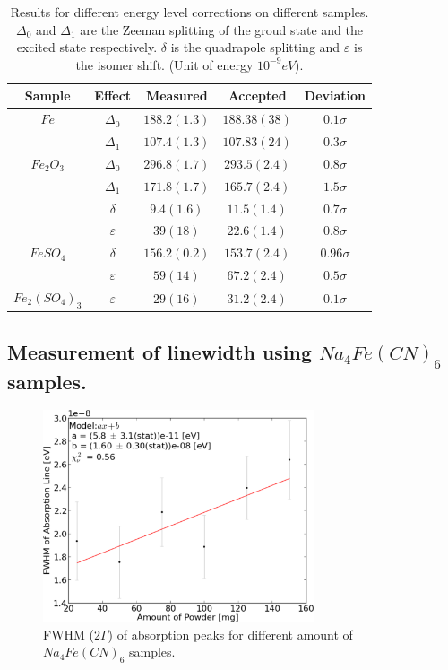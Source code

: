 \documentclass[aps,twocolumn,secnumarabic,balancelastpage,amsmath,amssymb,nofootinbib]{revtex4}
\begin{document}
\begin{table}
  \begin{tabular}{|c|c|c|c|c|}
    \hline
    Sample&Effect&Measured&Accepted&Deviation\\\hline
    $Fe$\cite{data3}&$\Delta_0$&$188.2(1.3)$&$188.38(38)$&$0.1\sigma$\\\cline{2-5}
    &$\Delta_1$&$107.4(1.3)$&$107.83(24)$&$0.3\sigma$\\\hline
    $Fe_2O_3$\cite{data1}\cite{data2}&$\Delta_0$&$296.8(1.7)$&$293.5(2.4)$&$0.8\sigma$\\\cline{2-5}
    &$\Delta_1$&$171.8(1.7)$&$165.7(2.4)$&$1.5\sigma$\\\cline{2-5}
    &$\delta$&$9.4(1.6)$&$11.5(1.4)$&$0.7\sigma$\\\cline{2-5}
    &$\varepsilon$&$39(18)$&$22.6(1.4)$&$0.8\sigma$\\\hline
    $FeSO_4$\cite{data1}&$\delta$&$156.2(0.2)$&$153.7(2.4)$&$0.96\sigma$\\\cline{2-5}
    &$\varepsilon$&$59(14)$&$67.2(2.4)$&$0.5\sigma$\\\hline
    $Fe_2(SO_4)_3$\cite{data1}&$\varepsilon$&$29(16)$&$31.2(2.4)$&$0.1\sigma$\\\hline
  \end{tabular}
  \caption{Results for different energy level corrections on different samples. $\Delta_0$ and $\Delta_1$ are the Zeeman splitting of the groud state and the excited state respectively. $\delta$ is the quadrapole splitting and $\varepsilon$ is the isomer shift. (Unit of energy $10^{-9}eV$).}
  \label{res_table}
\end{table}

\subsection{Measurement of linewidth using $Na_4Fe(CN)_6$ samples.}
\begin{figure}
  \includegraphics[width=8cm]{../share/line_width.png}
  \caption{FWHM ($2\Gamma$) of absorption peaks for different amount of $Na_4Fe(CN)_6$ samples.}
  \label{line_width}
\end{figure}
\end{document}
